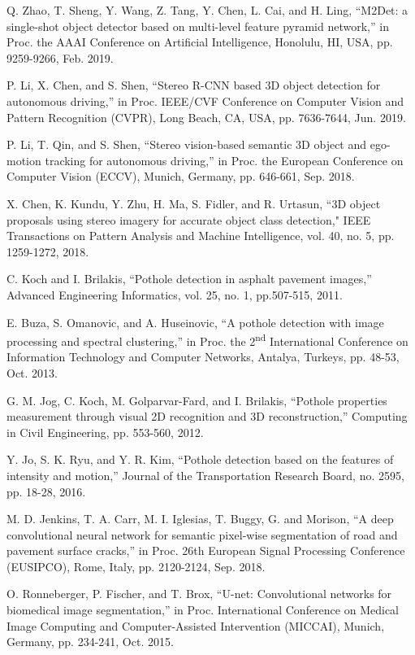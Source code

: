 \documentclass{ieeeaccess}
\begin{document}
\begin{thebibliography}{00}
 Q. Zhao, T. Sheng, Y. Wang, Z. Tang, Y. Chen, L. Cai, and H. Ling, ``M2Det: a single-shot object detector based on multi-level feature pyramid network,'' in Proc. the AAAI Conference on Artificial Intelligence, Honolulu, HI, USA, pp. 9259-9266, Feb. 2019.

 P. Li, X. Chen, and S. Shen, ``Stereo R-CNN based 3D object detection for autonomous driving,'' in Proc. IEEE/CVF Conference on Computer Vision and Pattern Recognition (CVPR), Long Beach, CA, USA, pp. 7636-7644, Jun. 2019.

 P. Li, T. Qin, and S. Shen, ``Stereo vision-based semantic 3D object and ego-motion tracking for autonomous driving,'' in Proc. the European Conference on Computer Vision (ECCV),  Munich, Germany, pp. 646-661, Sep. 2018. 

 X. Chen, K. Kundu, Y. Zhu, H. Ma, S. Fidler, and R. Urtasun, ``3D object proposals using stereo imagery for accurate object class detection," IEEE Transactions on Pattern Analysis and Machine Intelligence, vol. 40, no. 5, pp. 1259-1272, 2018.

 C. Koch and I. Brilakis, ``Pothole detection in asphalt pavement images,'' Advanced Engineering Informatics, vol. 25, no. 1, pp.507-515, 2011.

 E. Buza, S. Omanovic, and A. Huseinovic, ``A pothole detection with image processing and spectral clustering,'' in Proc. the 2\textsuperscript{nd} International Conference on Information Technology and Computer Networks, Antalya, Turkeys, pp. 48-53, Oct. 2013.

 G. M. Jog, C. Koch, M. Golparvar-Fard, and I. Brilakis, ``Pothole properties measurement through visual 2D recognition and 3D reconstruction,'' Computing in Civil Engineering, pp. 553-560, 2012.

 Y. Jo, S. K. Ryu, and Y. R. Kim, ``Pothole detection based on the features of intensity and motion,'' Journal of the Transportation Research Board, no. 2595, pp. 18-28, 2016.

 M. D. Jenkins, T. A. Carr,  M. I. Iglesias, T. Buggy, G. and Morison, ``A deep convolutional neural network for semantic pixel-wise segmentation of road and pavement surface cracks,'' in Proc. 26th European Signal Processing Conference (EUSIPCO), Rome, Italy, pp. 2120-2124, Sep. 2018.

 O. Ronneberger, P. Fischer, and T. Brox, ``U-net: Convolutional networks for biomedical image segmentation,'' in Proc. International Conference on Medical Image Computing and Computer-Assisted Intervention (MICCAI), Munich, Germany, pp. 234-241, Oct. 2015.


\end{thebibliography}
\end{document}
